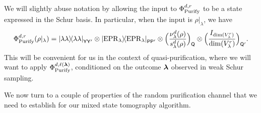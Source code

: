 \begin{notation}
    We will slightly abuse notation by allowing the input to $\Phi_{\mathrm{Purify}}^{d,r}$ to be a state expressed in the Schur basis. In particular, when the input is $\rho|_\lambda$, we have
    \begin{equation*}
        \Phi_{\mathrm{Purify}}^{d,r}(\rho|_{\lambda})
    = \ketbra{\lambda\lambda}{\lambda\lambda}_{\mathsf{Y} \mathsf{Y'}} \otimes \ketbra{\mathrm{EPR}_{\lambda}}{\mathrm{EPR}_{\lambda}}_{\mathsf{P} \mathsf{P'}} \otimes \Big(\frac{\nu^d_{\lambda}(\rho)}{s^d_{\lambda}(\rho)}\Big)_{\mathsf{Q}}  \otimes \Big(\frac{I_{\dim(V_{\lambda}^{r})}}{\dim(V_{\lambda}^{r})}\Big)_{\mathsf{Q'}}.
    \end{equation*}
    This will be convenient for us in the context of quasi-purification, where we will want to apply $\Phi_{\mathrm{Purify}}^{d,\ell(\boldsymbol{\lambda})}$, conditioned on the outcome $\boldsymbol{\lambda}$ observed in weak Schur sampling. 
\end{notation}





We now turn to a couple of properties of the random purification channel that we need to establish for our mixed state tomography algorithm. 





